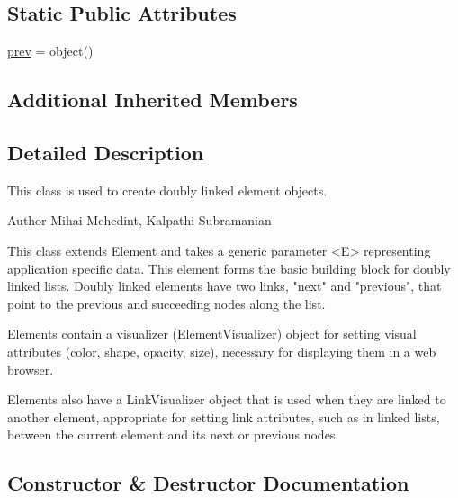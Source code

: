 \subsection*{Static Public Attributes}
\begin{DoxyCompactItemize}
\item 
\mbox{\hyperlink{class_bridges_1_1_d_lelement_1_1_d_lelement_a08e7ba4d3ea7b49409b470752ca75ad1}{prev}} = object()
\end{DoxyCompactItemize}
\subsection*{Additional Inherited Members}


\subsection{Detailed Description}
This class is used to create doubly linked element objects. 

\begin{DoxyAuthor}{Author}
Mihai Mehedint, Kalpathi Subramanian
\end{DoxyAuthor}
\begin{DoxyVerb}This class extends Element and takes a generic parameter <E> representing
application specific data. This element forms the basic building block for
doubly linked lists. Doubly linked elements have two links,
"next" and "previous", that point to the previous and succeeding nodes along the list.

Elements contain a visualizer (ElementVisualizer) object for setting visual
attributes (color, shape, opacity, size), necessary for displaying them in a web
browser.

Elements also have a LinkVisualizer object that is used when they are linked to
another element, appropriate for setting link attributes, such as in linked lists,
between the current element and its next or previous nodes.\end{DoxyVerb}
 

\subsection{Constructor \& Destructor Documentation}
\mbox{\label{class_bridges_1_1_d_lelement_1_1_d_lelement_ab25b4475c850ba7ec3b326df8e43e861}} 
